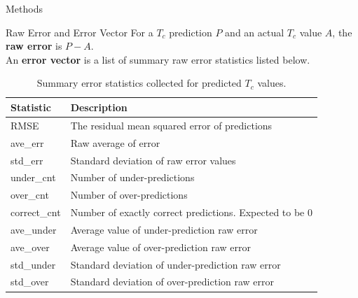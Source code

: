 \documentclass{beamer}
\begin{document}
  \begin{frame}{Methods}
  \begin{block}{Raw Error and Error Vector}
    For a $T_c$ prediction $P$ and an actual $T_c$ value $A$, the \textbf{raw error} is $P-A$.\\
    An \textbf{error vector} is a list of summary raw error statistics listed below.
  \end{block}
       \begin{table}[]
       \tiny
     \centering
     \begin{tabularx}{\linewidth}{X X}
     \hline
     Statistic & Description\\
     \hline
       RMSE & The residual mean squared error of predictions \\
        ave\_err  & Raw average of error\\
        std\_err & Standard deviation of raw error values\\
        under\_cnt & Number of under-predictions\\
        over\_cnt & Number of over-predictions\\
        correct\_cnt & Number of exactly correct predictions. Expected to be 0\\
        ave\_under & Average value of under-prediction raw error\\
        ave\_over & Average value of over-prediction raw error\\
        std\_under & Standard deviation of under-prediction raw error\\
        std\_over & Standard deviation of over-prediction raw error\\
        \hline
     \end{tabularx}
     \caption{Summary error statistics collected for predicted $T_c$ values.}
     \label{tab:err_stats}
 \end{table}
  \end{frame}
  
 
  
\end{document}
